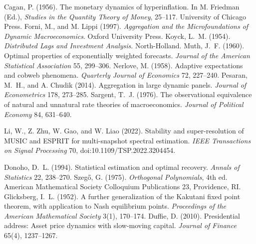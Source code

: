  Cagan, P. (1956). The monetary dynamics of hyperinflation. In M. Friedman (Ed.), \emph{Studies in the Quantity Theory of Money}, 25--117. University of Chicago Press.
 Forni, M., and M. Lippi (1997). \emph{Aggregation and the Microfoundations of Dynamic Macroeconomics}. Oxford University Press.
 Koyck, L.~M. (1954). \emph{Distributed Lags and Investment Analysis}. North-Holland.
 Muth, J.~F. (1960). Optimal properties of exponentially weighted forecasts. \emph{Journal of the American Statistical Association} 55, 299--306.
 Nerlove, M. (1958). Adaptive expectations and cobweb phenomena. \emph{Quarterly Journal of Economics} 72, 227--240.
 Pesaran, M.~H., and A. Chudik (2014). Aggregation in large dynamic panels. \emph{Journal of Econometrics} 178, 273--285.
 Sargent, T.~J. (1976). The observational equivalence of natural and unnatural rate theories of macroeconomics. \emph{Journal of Political Economy} 84, 631--640.

 Li, W., Z. Zhu, W. Gao, and W. Liao (2022). Stability and super-resolution of MUSIC and ESPRIT for multi-snapshot spectral estimation. \emph{IEEE Transactions on Signal Processing} 70, doi:10.1109/TSP.2022.3204454.

 Donoho, D.~L. (1994). Statistical estimation and optimal recovery. \emph{Annals of Statistics} 22, 238--270.
 Szeg\H{o}, G. (1975). \emph{Orthogonal Polynomials}, 4th ed. American Mathematical Society Colloquium Publications 23, Providence, RI.
 Glicksberg, I.~L. (1952). A further generalization of the Kakutani fixed point theorem, with application to Nash equilibrium points. \emph{Proceedings of the American Mathematical Society} 3(1), 170--174.
 Duffie, D. (2010). Presidential address: Asset price dynamics with slow-moving capital. \emph{Journal of Finance} 65(4), 1237--1267.

